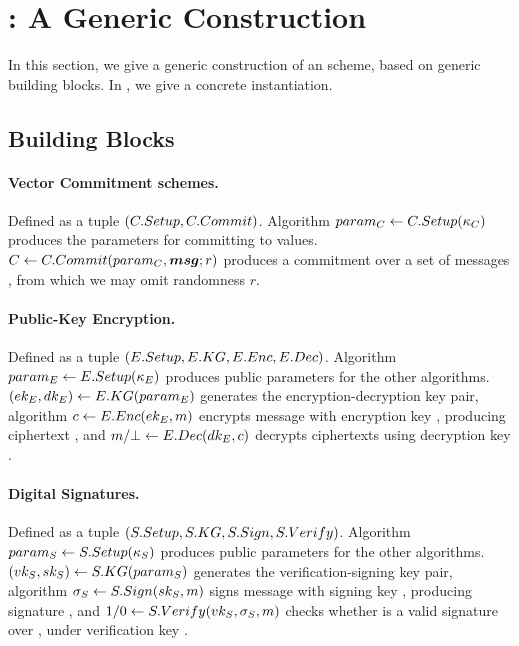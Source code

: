 \section{\CUASGen: A Generic \UAS Construction}
\label{sec:gen-construction}

In this section, we give a generic construction of an \UAS scheme, based on
generic building blocks. In , we give a concrete
instantiation.

\subsection{Building Blocks}
\label{ssec:bblocks}

\paragraph{Vector Commitment schemes.} %
Defined as a tuple $(C.Setup,C.Commit)$. Algorithm $param_C \gets
C.Setup(\kappa_{C})$ produces the parameters for committing to values. $C
\gets C.Commit(param_C, \boldsymbol{msg}; r)$ produces a commitment \Ccom over a set of
messages \msgset, from which we may omit randomness $r$. 

\paragraph{Public-Key Encryption.} %
Defined as a tuple $(E.Setup,E.KG,E.Enc,E.Dec)$. Algorithm $param_{E} \gets
E.Setup(\kappa_{E})$ produces public parameters for the other algorithms.
$(ek_{E},dk_{E}) \gets E.KG(param_{E})$ generates the encryption-decryption key
pair, algorithm $c \gets E.Enc(ek_{E},m)$ encrypts message \msg with
encryption key \Eek, producing ciphertext \Ec, and $m/\bot \gets E.Dec(dk_{E},
c)$ decrypts ciphertexts using decryption key \Edk. 

\paragraph{Digital Signatures.} %
Defined as a tuple $(S.Setup,S.KG,S.Sign,S.Verify)$. Algorithm $param_{S} \gets
S.Setup(\kappa_{S})$ produces public parameters for the other algorithms.
$(vk_{S},sk_{S}) \gets S.KG(param_{S})$ generates the verification-signing key
pair, algorithm $\sigma_{S} \gets S.Sign(sk_{S},m)$ signs message \msg with
signing key \Ssk, producing signature \Ssig, and $1/0 \gets S.Verify(vk_{S},
\sigma_{S},m)$ checks whether \Ssig is a valid signature over \msg, under
verification key \Svk. 

